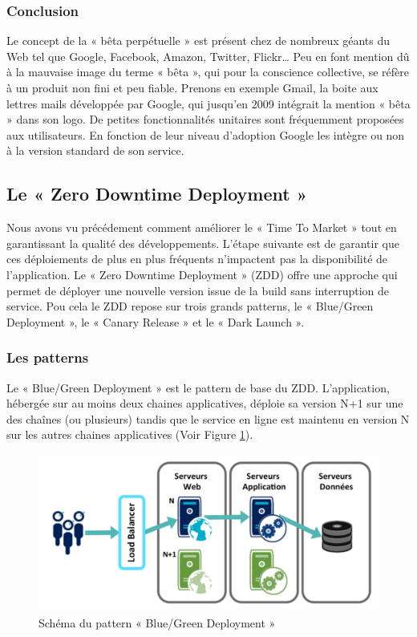       \subsubsection{Conclusion}
      Le concept de la « bêta perpétuelle » est présent chez de nombreux géants du Web tel que Google, Facebook, Amazon, Twitter, Flickr… Peu en font mention dû à la mauvaise image du terme « bêta », qui pour la conscience collective, se réfère à un produit non fini et peu fiable. Prenons en exemple Gmail, la boite aux lettres mails développée par Google, qui jusqu’en 2009 intégrait la mention « bêta » dans son logo. De petites fonctionnalités unitaires sont fréquemment proposées aux utilisateurs. En fonction de leur niveau d’adoption Google les intègre ou non à la version standard de son service.

      \subsection{Le « Zero Downtime Deployment »}
      Nous avons vu précédement comment améliorer le « Time To Market » tout en garantissant la qualité des développements. L'étape suivante est de garantir que ces déploiements de plus en plus fréquents n'impactent pas la disponibilité de l'application. Le « Zero Downtime Deployment » (ZDD) offre une approche qui permet de déployer une nouvelle version issue de la build sans interruption de service. Pou cela le ZDD repose sur trois grands patterns, le « Blue/Green Deployment », le « Canary Release » et le « Dark Launch ».
        \subsubsection{Les patterns}
        Le « Blue/Green Deployment » est le pattern de base du ZDD. L’application, hébergée sur au moins deux chaines applicatives, déploie sa version N+1 sur une des chaînes (ou plusieurs) tandis que le service en ligne est maintenu en version N sur les autres chaines applicatives (Voir Figure \ref{BlueGreen}).\\

        \begin{figure}
          \begin{center}
            \includegraphics[scale=0.7]{images/BlueGreenDeployment.png}
          \end{center}
          \caption{Schéma du pattern « Blue/Green Deployment »}
          \label{BlueGreen}
        \end{figure}

